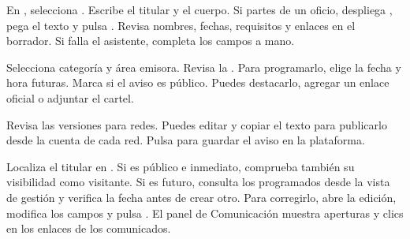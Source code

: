 
\newcommand{\volumen}{Operación institucional}


\begin{pasos}
\item En , selecciona . Escribe el titular y el cuerpo. Si partes de un oficio, despliega , pega el texto y pulsa . Revisa nombres, fechas, requisitos y enlaces en el borrador. Si falla el asistente, completa los campos a mano.
\item Selecciona categoría y área emisora. Revisa la . Para programarlo, elige la fecha y hora futuras. Marca  si el aviso es público. Puedes destacarlo, agregar un enlace oficial o adjuntar el cartel.
\item Revisa las versiones para redes. Puedes editar y copiar el texto para publicarlo desde la cuenta de cada red. Pulsa  para guardar el aviso en la plataforma.
\end{pasos}
Localiza el titular en . Si es público e inmediato, comprueba también su visibilidad como visitante. Si es futuro, consulta los programados desde la vista de gestión y verifica la fecha antes de crear otro. Para corregirlo, abre la edición, modifica los campos y pulsa . El panel de Comunicación muestra aperturas y clics en los enlaces de los comunicados.

